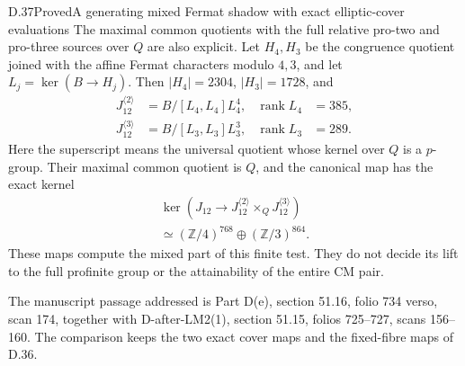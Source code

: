 \begin{statement}{D.37}{Proved}{A generating mixed Fermat shadow with exact elliptic-cover evaluations}
The maximal common quotients with the full relative pro-two
and pro-three sources over $Q$ are also explicit. Let $H_4,H_3$
be the congruence quotient joined with the affine Fermat
characters modulo $4,3$, and let $L_j=\ker(B\to H_j)$.
Then $|H_4|=2304$, $|H_3|=1728$, and
\[
 \begin{aligned}
 J_{12}^{\langle2\rangle}&=B/[L_4,L_4]L_4^4,
       &\operatorname{rank}L_4&=385,\\
 J_{12}^{\langle3\rangle}&=B/[L_3,L_3]L_3^3,
       &\operatorname{rank}L_3&=289.
 \end{aligned}                                           \tag{D.37.5}
\]
Here the superscript means the universal quotient whose
kernel over $Q$ is a $p$-group. Their maximal common quotient
is $Q$, and the canonical map has the exact kernel
\[
 \begin{gathered}
 \ker\left(J_{12}\longrightarrow
 J_{12}^{\langle2\rangle}\mathbin{\times_Q}
 J_{12}^{\langle3\rangle}\right)\\
 \simeq (\mathbb Z/4)^{768}\oplus(\mathbb Z/3)^{864}.
 \end{gathered}
                                                               \tag{D.37.6}
\]
These maps compute the mixed part of this finite test. They
do not decide its lift to the full profinite group or the
attainability of the entire CM pair.

The manuscript passage addressed is Part D(e), section
51.16, folio 734 verso, scan 174, together with
D-after-LM2(1), section 51.15, folios 725--727,
scans 156--160. The comparison keeps the two exact cover
maps and the fixed-fibre maps of D.36.
\end{statement}
